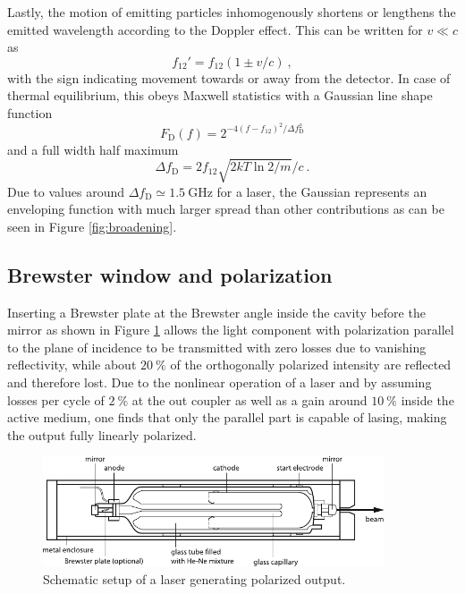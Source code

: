 Lastly, the motion of emitting particles inhomogenously shortens or lengthens the emitted wavelength according to the Doppler effect.
This can be written for $v \ll c$ as
\begin{equation*}
	f_{12}' = f_{12} (1 \pm v / c) \: ,
\end{equation*}
with the sign indicating movement towards or away from the detector. In case of thermal equilibrium, this obeys Maxwell statistics with
a Gaussian line shape function
\begin{equation*}
	F_\text{D} (f) = 2^{- 4 (f - f_{12})^2 / \Delta f_\text{D}^2}
\end{equation*}
and a full width half maximum
\begin{equation}
	\Delta f_\text{D} = 2 f_{12} \sqrt{2kT \ln 2 / m} / c \: .
	\label{eqn:fwhm}
\end{equation}
Due to values around $\Delta f_\text{D} \simeq \qty{1.5}{\giga\hertz}$ for a \HeNe laser, the Gaussian represents an enveloping function
with much larger spread than other contributions as can be seen in Figure \ref{fig:broadening}.



\subsection{Brewster window and polarization}

Inserting a Brewster plate at the Brewster angle inside the cavity before the mirror as shown in Figure \ref{fig:setup} allows the light
component with polarization parallel to the plane of incidence to be transmitted with zero losses due to vanishing reflectivity, while
about $\qty{20}{\percent}$ of the orthogonally polarized intensity are reflected and therefore lost. Due to the nonlinear operation of
a laser and by assuming losses per cycle of $\qty{2}{\percent}$ at the out coupler as well as a gain around $\qty{10}{\percent}$ inside
the active medium, one finds that only the parallel part is capable of lasing, making the output fully linearly polarized.

\begin{figure}[H]
	\centering
	\includegraphics[width=0.90\textwidth]{content/graphics/setup.pdf}
	\caption{Schematic setup of a \HeNe laser generating polarized output. \cite{Eichler_2018}}
	\label{fig:setup}
\end{figure}

